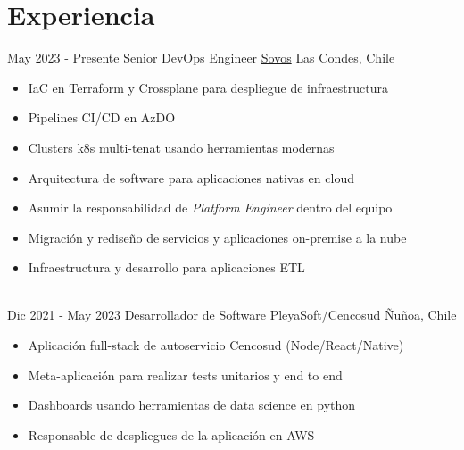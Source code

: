 \documentclass[letterpaper]{twentysecondcv} %
\begin{document}
\makeprofile %


\section{Experiencia}

\begin{twenty} %
\twentyitem
    	{\small May 2023 -}
		{\small Presente}
        {Senior DevOps Engineer}
        {\href{https://sovos.com}{Sovos}}
        {\small Las Condes, Chile}
        {
        \begin{itemize}
            \item IaC en Terraform y Crossplane para despliegue de infraestructura
            \item Pipelines CI/CD en AzDO
            \item Clusters k8s multi-tenat usando herramientas modernas
            \item Arquitectura de software para aplicaciones nativas en cloud
            \item Asumir la responsabilidad de \textit{Platform Engineer} dentro del equipo
            \item Migración y rediseño de servicios y aplicaciones on-premise a la nube
            \item Infraestructura y desarrollo para aplicaciones ETL
        \end{itemize}}
        \\

\twentyitem
    	{\small Dic 2021 -}
		{\small May 2023}
        {Desarrollador de Software}
        {\href{https://pleyasoft.com/}{PleyaSoft}/\href{https://cencosud.com}{Cencosud}}
        {\small Ñuñoa, Chile}
        {
        \begin{itemize}
            \item Aplicación full-stack de autoservicio Cencosud (Node/React/Native)
            \item Meta-aplicación para realizar tests unitarios y end to end
            \item Dashboards usando herramientas de data science en python
            \item Responsable de despliegues de la aplicación en AWS
        \end{itemize}}
        \\


\end{twenty}
\end{document}
